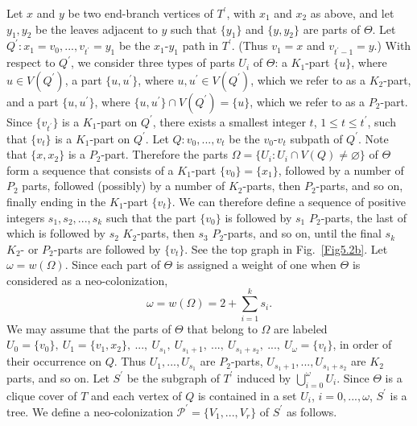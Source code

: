 \documentclass[12pt]{article}%
\begin{document}
Let $x$ and $y$ be two end-branch vertices of $T^{\prime}$, with $x_{1}$ and
$x_{2}$ as above, and let $y_{1},y_{2}$ be the leaves adjacent to $y$ such
that $\{y_{1}\}$ and $\{y,y_{2}\}$ are parts of $\Theta$. Let $Q^{\prime
}:x_{1}=v_{0},...,v_{t^{\prime}}=y_{1}$ be the $x_{1}$-$y_{1}$ path in
$T^{\prime}$. (Thus $v_{1}=x$ and $v_{t^{\prime}-1}=y$.) With respect to
$Q^{\prime}$, we consider three types of parts $U_{i}$ of $\Theta$: a $K_{1}%
$-part $\{u\}$, where $u\in V(Q^{\prime})$, a part $\{u,u^{\prime}\}$, where
$u,u^{\prime}\in V(Q^{\prime})$, which we refer to as a $K_{2}$-part, and a
part $\{u,u^{\prime}\}$, where $\{u,u^{\prime}\}\cap V(Q^{\prime})=\{u\}$,
which we refer to as a $P_{2}$-part. Since $\{v_{t^{\prime}}\}$ is a $K_{1}%
$-part on $Q^{\prime}$, there exists a smallest integer $t$, $1\leq t\leq
t^{\prime}$, such that $\{v_{t}\}$ is a $K_{1}$-part on $Q^{\prime}$. Let
$Q:v_{0},...,v_{t}$ be the $v_{0}$-$v_{t}$ subpath of $Q^{\prime}$. Note that
$\{x,x_{2}\}$ is a $P_{2}$-part. Therefore the parts $\Omega=\{U_{i}:U_{i}\cap
V(Q)\neq\varnothing\}$ of $\Theta$ form a sequence that consists of a $K_{1}%
$-part $\{v_{0}\}=\{x_{1}\}$, followed by a number of $P_{2}$ parts, followed
(possibly) by a number of $K_{2}$-parts, then $P_{2}$-parts, and so on,
finally ending in the $K_{1}$-part $\{v_{t}\}$. We can therefore define a
sequence of positive integers $s_{1},s_{2},...,s_{k}$ such that the part
$\{v_{0}\}$ is followed by $s_{1}$ $P_{2}$-parts, the last of which is
followed by $s_{2}$ $K_{2}$-parts, then $s_{3}$ $P_{2}$-parts, and so on,
until the final $s_{k}$ $K_{2}$- or $P_{2}$-parts are followed by $\{v_{t}\}$.
See the top graph in Fig.~\ref{Fig5.2b}. Let $\omega=w(\Omega)$. Since each
part of $\Theta$ is assigned a weight of one when $\Theta$ is considered as a
neo-colonization,
\begin{equation}
\omega=w(\Omega)=2+\sum_{i=1}^{k}s_{i}. \label{eqOmega}%
\end{equation}
We may assume that the parts of $\Theta$ that belong to $\Omega$ are labeled
$U_{0}=\{v_{0}\},\ U_{1}=\{v_{1},x_{2}\},\ ...,\ U_{s_{1}},\ U_{s_{1}%
+1},\ ...,\ U_{s_{1}+s_{2}},\ ...,\ U_{\omega}=\{v_{t}\}$, in order of their
occurrence on $Q$. Thus $U_{1},...,U_{s_{1}}$ are $P_{2}$-parts, $U_{s_{1}%
+1},...,U_{s_{1}+s_{2}}$ are $K_{2}$ parts, and so on. Let $S^{\prime}$ be the
subgraph of $T^{\prime}$ induced by $\bigcup_{i=0}^{\omega}U_{i}$. Since
$\Theta$ is a clique cover of $T$ and each vertex of $Q$ is contained in a set
$U_{i}$, $i=0,...,\omega$, $S^{\prime}$ is a tree. We define a
neo-colonization $\mathcal{P}^{\prime}=\{V_{1},...,V_{r}\}$ of $S^{\prime}$ as follows.%
\end{document}
